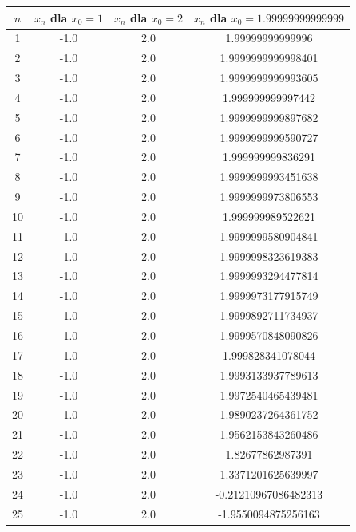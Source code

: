 \documentclass{article}
\begin{document}
\begin{table}[h!]
    \centering
    \begin{tabular}{ |c|c|c|c| }
    \hline
    $n$ & $x_n$ dla $x_0 = 1$ & $x_n$ dla $x_0 = 2$ & $x_n$ dla $x_0 = 1.99999999999999$  \\
    \hline
    1 & -1.0 & 2.0 & 1.99999999999996 \\
    \hline
    2 & -1.0 & 2.0 & 1.9999999999998401 \\
    \hline
    3 & -1.0 & 2.0 & 1.9999999999993605 \\
    \hline
    4 & -1.0 & 2.0 & 1.999999999997442 \\
    \hline
    5 & -1.0 & 2.0 & 1.9999999999897682 \\
    \hline
    6 & -1.0 & 2.0 & 1.9999999999590727 \\
    \hline
    7 & -1.0 & 2.0 & 1.999999999836291 \\
    \hline
    8 & -1.0 & 2.0 & 1.9999999993451638 \\
    \hline
    9 & -1.0 & 2.0 & 1.9999999973806553 \\
    \hline
    10 & -1.0 & 2.0 & 1.999999989522621 \\
    \hline
    11 & -1.0 & 2.0 & 1.9999999580904841 \\
    \hline
    12 & -1.0 & 2.0 & 1.9999998323619383 \\
    \hline
    13 & -1.0 & 2.0 & 1.9999993294477814 \\
    \hline
    14 & -1.0 & 2.0 & 1.9999973177915749 \\
    \hline
    15 & -1.0 & 2.0 & 1.9999892711734937 \\
    \hline
    16 & -1.0 & 2.0 & 1.9999570848090826 \\
    \hline
    17 & -1.0 & 2.0 & 1.999828341078044 \\
    \hline
    18 & -1.0 & 2.0 & 1.9993133937789613 \\
    \hline
    19 & -1.0 & 2.0 & 1.9972540465439481 \\
    \hline
    20 & -1.0 & 2.0 & 1.9890237264361752 \\
    \hline
    21 & -1.0 & 2.0 & 1.9562153843260486 \\
    \hline
    22 & -1.0 & 2.0 & 1.82677862987391 \\
    \hline
    23 & -1.0 & 2.0 & 1.3371201625639997 \\
    \hline
    24 & -1.0 & 2.0 & -0.21210967086482313 \\
    \hline
    25 & -1.0 & 2.0 & -1.9550094875256163 \\

\end{tabular}
\end{table}
\end{document}
